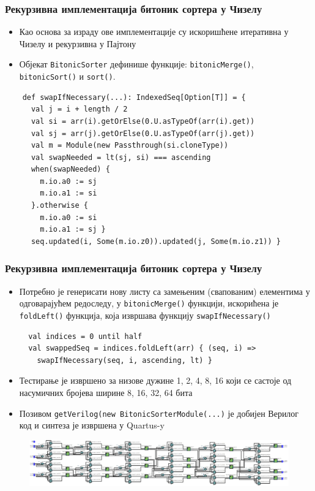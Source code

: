 \begin{frame}[fragile]
\frametitle{Рекурзивна имплементација битоник сортера у Чизелу}
 \begin{itemize}
 \item Као основа за израду ове имплементације су искоришћене итеративна у Чизелу и рекурзивна у Пајтону
 \item Објекат \verb+BitonicSorter+ дефинише функције: \verb+bitonicMerge()+, \verb+bitonicSort()+ и \verb+sort()+.
 \end{itemize}

    \begin{verbatim}
    def swapIfNecessary(...): IndexedSeq[Option[T]] = {
      val j = i + length / 2
      val si = arr(i).getOrElse(0.U.asTypeOf(arr(i).get))
      val sj = arr(j).getOrElse(0.U.asTypeOf(arr(j).get))
      val m = Module(new Passthrough(si.cloneType))
      val swapNeeded = lt(sj, si) === ascending
      when(swapNeeded) {
        m.io.a0 := sj
        m.io.a1 := si
      }.otherwise {
        m.io.a0 := si
        m.io.a1 := sj }
      seq.updated(i, Some(m.io.z0)).updated(j, Some(m.io.z1)) }
  \end{verbatim}
\end{frame}

\begin{frame}[fragile]
\frametitle{Рекурзивна имплементација битоник сортера у Чизелу}
  \begin{itemize}
  \item Потребно је генерисати нову листу са замењеним (свапованим) елементима у одговарајућем редоследу, у \verb+bitonicMerge()+ функцији, искорићена је \verb+foldLeft()+ функција, која извршава функцију \verb+swapIfNecessary()+
    \begin{verbatim}
  val indices = 0 until half
  val swappedSeq = indices.foldLeft(arr) { (seq, i) =>
    swapIfNecessary(seq, i, ascending, lt) }
  \end{verbatim}
  \item Тестирање је извршено за низове дужине 1, 2, 4, 8, 16 који се састоје од насумичних бројева ширине 8, 16, 32, 64 бита
  \item Позивом \verb+getVerilog(new BitonicSorterModule(...)+ је добијен Верилог код и синтеза је извршена у Quartus-y
  \end{itemize}
  \begin{figure}[H]
  \centering
      \includegraphics[scale=0.15]{slike/RTL_Rec_8_8.png}
 \end{figure}
\end{frame}

